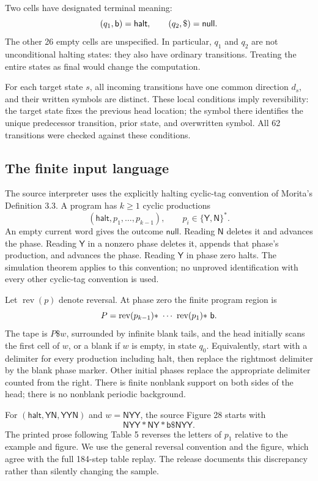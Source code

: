 \documentclass[11pt,letterpaper]{article}
\numberwithin{equation}{section}
\theoremstyle{definition}
\theoremstyle{remark}
\newcommand{\lab}[1]{\mathsf{#1}}\newcommand{\diag}{\operatorname{diag}}
\begin{document}
Two cells have designated terminal meaning:
\[
 (q_1,\blank)=\lab{halt},\qquad(q_2,\lab\$)=\lab{null}.
\]
The other 26 empty cells are unspecified. In particular, $q_1$ and $q_2$ are not unconditional halting states: they also have ordinary transitions. Treating the entire states as final would change the computation.

For each target state $s$, all incoming transitions have one common direction $d_s$, and their written symbols are distinct. These local conditions imply reversibility: the target state fixes the previous head location; the symbol there identifies the unique predecessor transition, prior state, and overwritten symbol. All 62 transitions were checked against these conditions.

\subsection{The finite input language}
The source interpreter uses the explicitly halting cyclic-tag convention of Morita's Definition 3.3. A program has $k\ge1$ cyclic productions
\[
 (\lab{halt},p_1,\ldots,p_{k-1}),\qquad p_i\in\{\lab Y,\lab N\}^{*}.
\]
An empty current word gives the outcome $\lab{null}$. Reading $\lab N$ deletes it and advances the phase. Reading $\lab Y$ in a nonzero phase deletes it, appends that phase's production, and advances the phase. Reading $\lab Y$ in phase zero halts. The simulation theorem applies to this convention; no unproved identification with every other cyclic-tag convention is used.

Let $\operatorname{rev}(p)$ denote reversal. At phase zero the finite program region is
\begin{equation}\label{smc:cs:eq:program}
 P=\operatorname{rev}(p_{k-1})\lab *\ \cdots\
       \operatorname{rev}(p_1)\lab *\ \blank.
\end{equation}
The tape is $P\lab\$w$, surrounded by infinite blank tails, and the head initially scans the first cell of $w$, or a blank if $w$ is empty, in state $q_0$. Equivalently, start with a delimiter for every production including halt, then replace the rightmost delimiter by the blank phase marker. Other initial phases replace the appropriate delimiter counted from the right. There is finite nonblank support on both sides of the head; there is no nonblank periodic background.

For $(\lab{halt},\lab{YN},\lab{YYN})$ and $w=\lab{NYY}$, the source Figure 28 starts with
\[
 \lab{NYY*NY*b\$NYY}.
\]
The printed prose following Table 5 reverses the letters of $p_1$ relative to the example and figure. We use the general reversal convention and the figure, which agree with the full 184-step table replay. The release documents this discrepancy rather than silently changing the sample.
\end{document}

